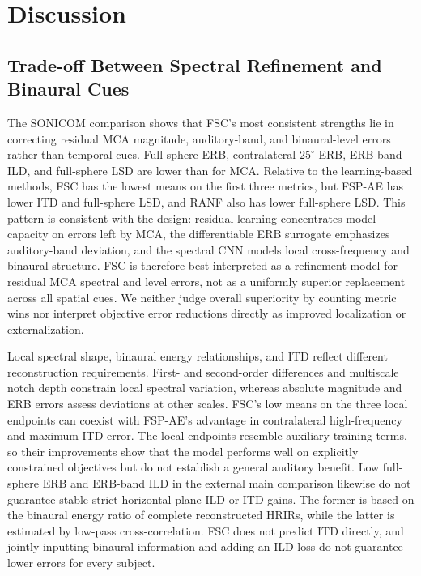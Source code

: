 \documentclass[UTF8,a4paper]{article}
\begin{document}
\section{Discussion}
\label{sec:discussion}

\subsection{Trade-off Between Spectral Refinement and Binaural Cues}

The SONICOM comparison shows that FSC's most consistent strengths lie in correcting residual MCA magnitude, auditory-band, and binaural-level errors rather than temporal cues. Full-sphere ERB, contralateral-$25^\circ$ ERB, ERB-band ILD, and full-sphere LSD are lower than for MCA. Relative to the learning-based methods, FSC has the lowest means on the first three metrics, but FSP-AE has lower ITD and full-sphere LSD, and RANF also has lower full-sphere LSD. This pattern is consistent with the design: residual learning concentrates model capacity on errors left by MCA, the differentiable ERB surrogate emphasizes auditory-band deviation, and the spectral CNN models local cross-frequency and binaural structure. FSC is therefore best interpreted as a refinement model for residual MCA spectral and level errors, not as a uniformly superior replacement across all spatial cues. We neither judge overall superiority by counting metric wins nor interpret objective error reductions directly as improved localization or externalization.

Local spectral shape, binaural energy relationships, and ITD reflect different reconstruction requirements. First- and second-order differences and multiscale notch depth constrain local spectral variation, whereas absolute magnitude and ERB errors assess deviations at other scales. FSC's low means on the three local endpoints can coexist with FSP-AE's advantage in contralateral high-frequency and maximum ITD error. The local endpoints resemble auxiliary training terms, so their improvements show that the model performs well on explicitly constrained objectives but do not establish a general auditory benefit. Low full-sphere ERB and ERB-band ILD in the external main comparison likewise do not guarantee stable strict horizontal-plane ILD or ITD gains. The former is based on the binaural energy ratio of complete reconstructed HRIRs, while the latter is estimated by low-pass cross-correlation. FSC does not predict ITD directly, and jointly inputting binaural information and adding an ILD loss do not guarantee lower errors for every subject.
\end{document}
